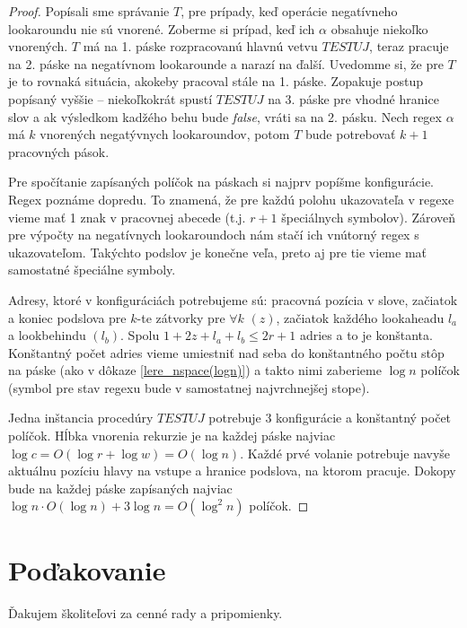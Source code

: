 \documentclass{svk_long_sk}
\begin{document}
\begin{proof}
Popísali sme správanie $T$, pre prípady, keď operácie negatívneho lookaroundu nie sú vnorené. Zoberme si prípad, keď ich $\alpha$ obsahuje niekoľko vnorených. $T$ má na 1. páske rozpracovanú hlavnú vetvu $TESTUJ$, teraz pracuje na 2. páske na negatívnom lookarounde a narazí na ďalší. Uvedomme si, že pre $T$ je to rovnaká situácia, akokeby pracoval stále na 1. páske. Zopakuje postup popísaný vyššie -- niekoľkokrát spustí $TESTUJ$ na 3. páske pre vhodné hranice slov a ak výsledkom kadžého behu bude \textit{false}, vráti sa na 2. pásku. Nech regex $\alpha$ má $k$ vnorených negatývnych lookaroundov, potom $T$ bude potrebovať $k+1$ pracovných pások.

Pre spočítanie zapísaných políčok na páskach si najprv popíšme konfigurácie. Regex poznáme dopredu. To znamená, že pre každú polohu ukazovateľa v regexe vieme mať 1 znak v pracovnej abecede (t.j. $r+1$ špeciálnych symbolov). Zároveň pre výpočty na negatívnych lookaroundoch nám stačí ich vnútorný regex s ukazovateľom. Takýchto podslov je konečne veľa, preto aj pre tie vieme mať samostatné špeciálne symboly. 

Adresy, ktoré v konfiguráciách potrebujeme sú: pracovná pozícia v slove, začiatok a koniec podslova pre $k$-te zátvorky pre $\forall k$ $(z)$, začiatok každého lookaheadu $l_a$ a lookbehindu $(l_b)$. Spolu $1+2z+l_a+l_b \leq 2r+1$ adries a to je konštanta. Konštantný počet adries vieme umiestniť nad seba do konštantného počtu stôp na páske (ako v dôkaze \ref{lere_nspace(logn)}) a takto nimi zaberieme $\log n$ políčok (symbol pre stav regexu bude v samostatnej najvrchnejšej stope).

Jedna inštancia procedúry $TESTUJ$ potrebuje 3 konfigurácie a konštantný počet políčok. Hĺbka vnorenia rekurzie je na každej páske najviac $\log c=O(\log r + \log w) = O(\log n)$. Každé prvé volanie potrebuje navyše aktuálnu pozíciu hlavy na vstupe a hranice podslova, na ktorom pracuje. Dokopy bude na každej páske zapísaných najviac $\log n \cdot O(\log n) + 3\log n = O(\log^2n)$ políčok.
\end{proof}


\section*{Poďakovanie}
Ďakujem školiteľovi za cenné rady a pripomienky.


\nocite{*}


\end{document}
